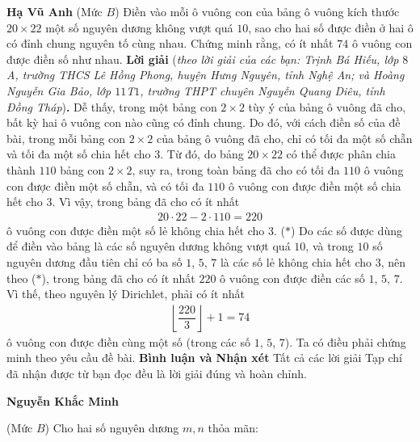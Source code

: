 \begin{multicols}{2}
	\vskip 0.05cm
	\hfill	\textbf{\color{thachthuctoanhoc}Hạ Vũ Anh}
	\vskip 0.01cm
	\columnbreak
	{}
	(Mức $B$) Điền vào mỗi ô vuông con của bảng ô vuông kích thước $20\times 22$ một số nguyên dương không vượt quá $10$, sao cho hai số được điền ở hai ô có đỉnh chung nguyên tố cùng nhau. Chứng minh rằng, có ít nhất $74$ ô vuông con được điền số như nhau.
	\vskip 0.05cm
	\textbf{\color{thachthuctoanhoc}Lời giải} (\textit{theo lời giải của các bạn: Trịnh Bá Hiếu, lớp $8$A, trường THCS Lê Hồng Phong, huyện Hưng Nguyên, tỉnh Nghệ An; và Hoàng Nguyễn Gia Bảo, lớp $11$T$1$, trường THPT chuyên Nguyễn Quang Diêu, tỉnh Đồng Tháp})\textbf{\color{thachthuctoanhoc}.}
	\vskip 0.05cm
	Dễ thấy, trong một bảng con $2 \times 2$ tùy ý của bảng ô vuông đã cho, bất kỳ hai ô vuông con nào cũng có đỉnh chung. Do đó, với cách điền số của đề bài, trong mỗi bảng con $2 \times 2$ của bảng ô vuông đã cho, chỉ có tối đa một số chẵn và tối đa một số chia hết cho $3$.
	\vskip 0.05cm
	Từ đó, do bảng $20 \times 22$ có thể được phân chia thành $110$ bảng con $2 \times 2$, suy ra, trong toàn bảng đã cho có tối đa $110$ ô vuông con được điền một số chẵn, và có tối đa $110$ ô vuông con được điền một số chia hết cho $3$. Vì vậy, trong bảng đã cho có ít nhất
	\begin{align*}
		20 \cdot 22 - 2 \cdot 110 = 220
	\end{align*}
	ô vuông con được điền một số lẻ không chia hết cho $3$. \hfill ($*$)
	\vskip 0.05cm
	Do các số được dùng để điền vào bảng là các số nguyên dương không vượt quá $10$, và trong $10$ số nguyên dương đầu tiên chỉ có ba số $1$, $5$, $7$ là các số lẻ không chia hết cho $3$, nên theo ($*$), trong bảng đã cho có ít nhất $220$ ô vuông con được điền các số $1$, $5$, $7$. Vì thế, theo nguyên lý Dirichlet, phải có ít nhất
	\begin{align*}
		\left\lfloor {\dfrac{{220}}{3}} \right\rfloor + 1 = 74
	\end{align*}
	ô vuông con được điền cùng một số (trong các số $1$, $5$, $7$).
	\vskip 0.05cm
	Ta có điều phải chứng minh theo yêu cầu đề bài.
	\vskip 0.05cm
	\textbf{\color{thachthuctoanhoc}Bình luận và Nhận xét}
	\vskip 0.05cm
	Tất cả các lời giải Tạp chí đã nhận được từ bạn đọc đều là lời giải đúng và hoàn chỉnh.
	\begin{flushright}
		\textbf{\color{thachthuctoanhoc}Nguyễn Khắc Minh}
	\end{flushright}
	{}
	(Mức $B$) Cho hai số nguyên dương $m, n$ thỏa mãn:

\end{multicols}
